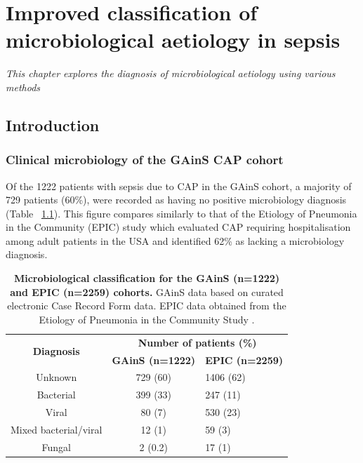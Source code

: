 \chapter{Improved classification of microbiological aetiology in sepsis}
\label{ch:Results2}
\textit{This chapter explores the diagnosis of microbiological aetiology using various methods}

\startcontents[chapters]{\vspace{-1.4cm}}
\singlespacing
{}
\doublespacing

\section{Introduction}
\subsection{Clinical microbiology of the GAinS CAP cohort}
Of the 1222 patients with sepsis due to CAP in the GAinS cohort, a majority of 729 patients (60\%), were recorded as having no positive microbiology diagnosis (Table ~\ref{tab:clinmicro}). This figure compares similarly to that of the Etiology of Pneumonia in the Community (EPIC) study \parencite{Jain2015} which evaluated CAP requiring hospitalisation among adult patients in the USA and identified 62\% as lacking a microbiology diagnosis. 

\FloatBarrier
\begin{table}[]
\begin{center}
\begin{tabular}{|c|c|l|}
\hline
\multirow{2}{*}{\textbf{Diagnosis}} & \multicolumn{2}{c|}{\textbf{Number of patients (\%)}} \\ \cline{2-3} 
                                    & \textbf{GAinS (n=1222)}    & \textbf{EPIC (n=2259)}   \\ \hline
Unknown                             & 729 (60)                   & 1406 (62)                \\ \hline
Bacterial                           & 399 (33)                   & 247 (11)                 \\ \hline
Viral                               & 80 (7)                     & 530 (23)                 \\ \hline
Mixed bacterial/viral               & 12 (1)                     & 59 (3)                   \\ \hline
Fungal                              & 2 (0.2)                    & 17 (1)                   \\ \hline
\end{tabular}
\end{center}
\smallskip
\caption[GAinS Clinical microbiology classification] {\textbf{Microbiological classification for the GAinS (n=1222) and EPIC (n=2259) cohorts.} GAinS data based on curated electronic Case Record Form data. EPIC data obtained from the Etiology of Pneumonia in the Community Study \parencite{Jain2015}.} 
\label{tab:clinmicro}
\end{table}

